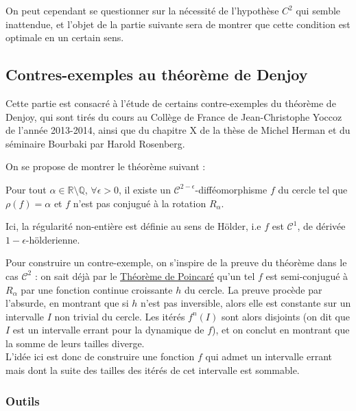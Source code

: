 \documentclass[11pt,a4paper]{article}
\begin{document}
On peut cependant se questionner sur la nécessité de l'hypothèse $C^2$ qui semble inattendue, et l'objet de la partie suivante sera de montrer que cette condition est optimale en un certain sens.


\subsection{Contres-exemples au théorème de Denjoy}
Cette partie est consacré à l'étude de certains contre-exemples du théorème de Denjoy, qui sont tirés du cours au Collège de France de Jean-Christophe Yoccoz de l'année 2013-2014, ainsi que du chapitre X de la thèse de Michel Herman \cite{herman} et du séminaire Bourbaki \cite{rosenberg} par Harold Rosenberg.

On se propose de montrer le théorème suivant :

\begin{thm}[Denjoy]\label{cex_denjoy}
Pour tout $\alpha \in \mathbb{R} \setminus \mathbb{Q}$, $\forall \epsilon > 0$, il existe un $\mathcal{C}^{2-\epsilon}$-difféomorphisme $f$ du cercle tel que $\rho(f)=\alpha$ et $f$ n'est pas conjugué à la rotation $R_\alpha$.
\end{thm}

\begin{rmq}
Ici, la  régularité non-entière est définie au sens de Hölder, i.e $f$ est $\mathcal{C}^1$, de dérivée $1-\epsilon$-hölderienne.
\end{rmq}

Pour construire un contre-exemple, on s'inspire de la preuve du théorème dans le cas $\mathcal{C}^2$ : on sait déjà par le \hyperref[poincare]{Théorème de Poincaré} qu'un tel $f$ est semi-conjugué à $R_\alpha$ par une fonction continue croissante $h$ du cercle. La preuve procède par l'absurde, en montrant que si $h$ n'est pas inversible, alors elle est constante sur un intervalle $I$ non trivial du cercle. Les itérés $f^n(I)$ sont alors disjoints (on dit que $I$ est un intervalle errant pour la dynamique de $f$), et on conclut en montrant que la somme de leurs tailles diverge. \\ 
L'idée ici est donc de construire une fonction $f$ qui admet un intervalle errant mais dont la suite des tailles des itérés de cet intervalle est sommable. 

\subsubsection{Outils}
\end{document}
